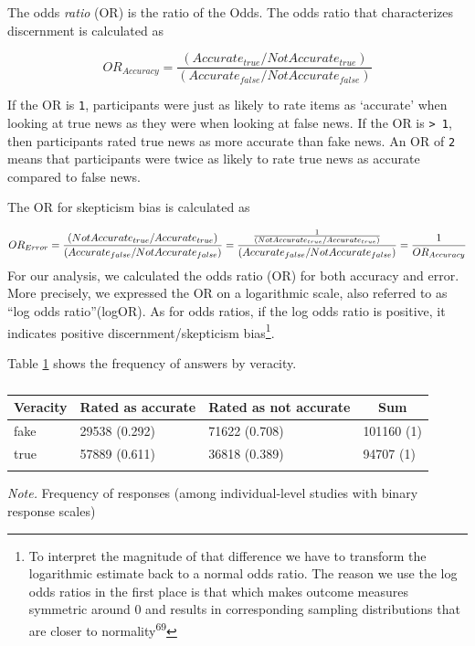 \documentclass[
  doc,floatsintext]{apa6}
\begin{document}
The odds \emph{ratio} (OR) is the ratio of the Odds. The odds ratio that characterizes discernment is calculated as

\[
OR_{Accuracy} = \frac{(Accurate_{true}/ NotAccurate_{true})}{(Accurate_{false}/ NotAccurate_{false})}
\]

If the OR is \texttt{1}, participants were just as likely to rate items as `accurate' when looking at true news as they were when looking at false news. If the OR is \texttt{\textgreater{}\ 1}, then participants rated true news as more accurate than fake news. An OR of \texttt{2} means that participants were twice as likely to rate true news as accurate compared to false news.

The OR for skepticism bias is calculated as

\[
OR_{Error} = \frac{(NotAccurate_{true}/Accurate_{true})}{(Accurate_{false}/NotAccurate_{false})} \leavevmode \newline
= \frac{\frac{1}{(NotAccurate_{true}/Accurate_{true})}}{(Accurate_{false}/NotAccurate_{false})} \leavevmode \newline
= \frac{1}{OR_{Accuracy}}
\]
For our analysis, we calculated the odds ratio (OR) for both accuracy and error. More precisely, we expressed the OR on a logarithmic scale, also referred to as ``log odds ratio''(logOR). As for odds ratios, if the log odds ratio is positive, it indicates positive discernment/skepticism bias\footnote{To interpret the magnitude of that difference we have to transform the logarithmic estimate back to a normal odds ratio. The reason we use the log odds ratios in the first place is that which makes outcome measures symmetric around 0 and results in corresponding sampling distributions that are closer to normality\textsuperscript{69}}.

Table \ref{tab:frequency} shows the frequency of answers by veracity.

\begin{table}[tbp]

\begin{center}
\begin{threeparttable}

\caption{\label{tab:frequency}}

\begin{tabular}{llll}
\toprule
Veracity & \multicolumn{1}{c}{Rated as accurate} & \multicolumn{1}{c}{Rated as not accurate} & \multicolumn{1}{c}{Sum}\\
\midrule
fake & 29538 (0.292) & 71622 (0.708) & 101160 (1)\\
true & 57889 (0.611) & 36818 (0.389) & 94707 (1)\\
\bottomrule
\addlinespace
\end{tabular}

\begin{tablenotes}[para]
\normalsize{\textit{Note.} Frequency of responses (among individual-level studies with binary response scales)}
\end{tablenotes}

\end{threeparttable}
\end{center}

\end{table}
\end{document}
